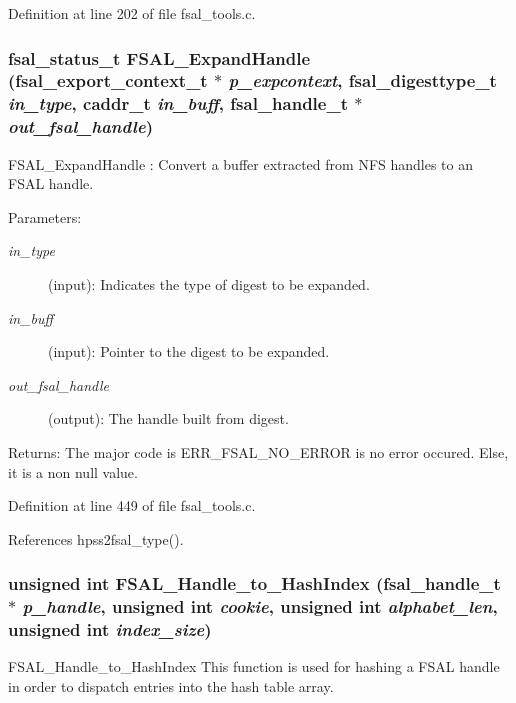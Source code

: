 Definition at line 202 of file fsal\_\-tools.c.
\subsubsection{\setlength{\rightskip}{0pt plus 5cm}fsal\_\-status\_\-t FSAL\_\-Expand\-Handle (fsal\_\-export\_\-context\_\-t $\ast$ {\em p\_\-expcontext}, fsal\_\-digesttype\_\-t {\em in\_\-type}, caddr\_\-t {\em in\_\-buff}, fsal\_\-handle\_\-t $\ast$ {\em out\_\-fsal\_\-handle})}\label{fsal__tools_8c_a9}


FSAL\_\-Expand\-Handle : Convert a buffer extracted from NFS handles to an FSAL handle.

\begin{Desc}
\item[Parameters:]
\begin{description}
\item[{\em in\_\-type}](input): Indicates the type of digest to be expanded. \item[{\em in\_\-buff}](input): Pointer to the digest to be expanded. \item[{\em out\_\-fsal\_\-handle}](output): The handle built from digest.\end{description}
\end{Desc}
\begin{Desc}
\item[Returns:]The major code is ERR\_\-FSAL\_\-NO\_\-ERROR is no error occured. Else, it is a non null value. \end{Desc}


Definition at line 449 of file fsal\_\-tools.c.

References hpss2fsal\_\-type().
\subsubsection{\setlength{\rightskip}{0pt plus 5cm}unsigned int FSAL\_\-Handle\_\-to\_\-Hash\-Index (fsal\_\-handle\_\-t $\ast$ {\em p\_\-handle}, unsigned int {\em cookie}, unsigned int {\em alphabet\_\-len}, unsigned int {\em index\_\-size})}\label{fsal__tools_8c_a6}


FSAL\_\-Handle\_\-to\_\-Hash\-Index This function is used for hashing a FSAL handle in order to dispatch entries into the hash table array.

